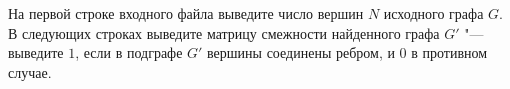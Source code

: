 На первой строке входного файла выведите число вершин $N$ исходного графа $G$.
В следующих строках выведите матрицу смежности найденного графа
$G'$ "--- выведите $1$, если в подграфе $G'$ вершины соединены ребром,
и $0$ в противном случае.
